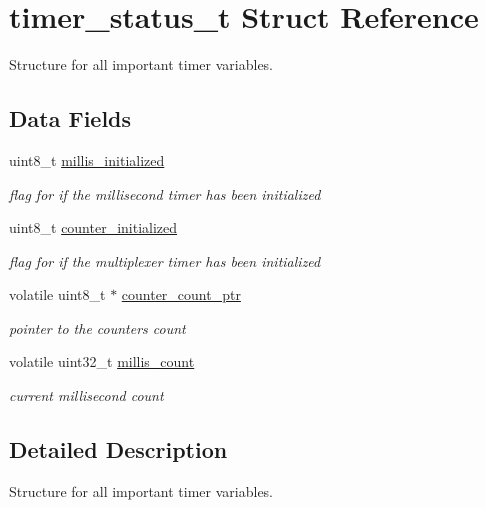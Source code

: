 \hypertarget{structtimer__status__t}{}\section{timer\+\_\+status\+\_\+t Struct Reference}
\label{structtimer__status__t}


Structure for all important timer variables.  


\subsection*{Data Fields}
\begin{DoxyCompactItemize}
\item 
uint8\+\_\+t \hyperlink{structtimer__status__t_a6d1fa9c7cc23c7a220fe2e10b21c7a36}{millis\+\_\+initialized}
\begin{DoxyCompactList}\small\item\em flag for if the millisecond timer has been initialized \end{DoxyCompactList}\item 
uint8\+\_\+t \hyperlink{structtimer__status__t_a73002fe8045c77d68c87dbb60289df08}{counter\+\_\+initialized}
\begin{DoxyCompactList}\small\item\em flag for if the multiplexer timer has been initialized \end{DoxyCompactList}\item 
volatile uint8\+\_\+t $\ast$ \hyperlink{structtimer__status__t_acbaa3c3476c9e234f13ae0051816699f}{counter\+\_\+count\+\_\+ptr}
\begin{DoxyCompactList}\small\item\em pointer to the counter\textquotesingle{}s count \end{DoxyCompactList}\item 
volatile uint32\+\_\+t \hyperlink{structtimer__status__t_af90d90b046e42ab75ab431f74b46b216}{millis\+\_\+count}
\begin{DoxyCompactList}\small\item\em current millisecond count \end{DoxyCompactList}\end{DoxyCompactItemize}


\subsection{Detailed Description}
Structure for all important timer variables. 

